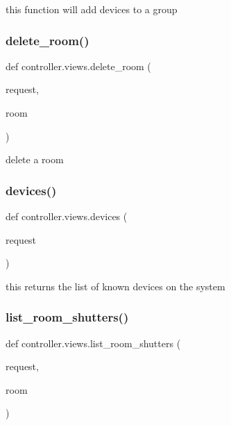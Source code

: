 this function will add devices to a group 

\mbox{\label{namespacecontroller_1_1views_a82f0cdbd29a35096496d79b7915ac89e}} 
\subsubsection{\texorpdfstring{delete\+\_\+room()}{delete\_room()}}
{\footnotesize\ttfamily def controller.\+views.\+delete\+\_\+room (\begin{DoxyParamCaption}\item[{}]{request,  }\item[{}]{room }\end{DoxyParamCaption})}



delete a room 

\mbox{\label{namespacecontroller_1_1views_a2d4dd7e1f8ecc0560922209253920718}} 
\subsubsection{\texorpdfstring{devices()}{devices()}}
{\footnotesize\ttfamily def controller.\+views.\+devices (\begin{DoxyParamCaption}\item[{}]{request }\end{DoxyParamCaption})}



this returns the list of known devices on the system 

\mbox{\label{namespacecontroller_1_1views_a552bb38779c88d2fd98d5116a7ee952e}} 
\subsubsection{\texorpdfstring{list\+\_\+room\+\_\+shutters()}{list\_room\_shutters()}}
{\footnotesize\ttfamily def controller.\+views.\+list\+\_\+room\+\_\+shutters (\begin{DoxyParamCaption}\item[{}]{request,  }\item[{}]{room }\end{DoxyParamCaption})}



